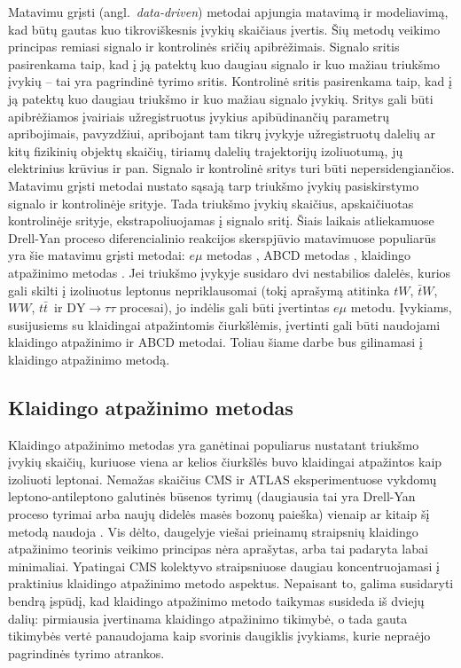 \documentclass[a4paper, 12pt, oneside]{article}
\newcommand{\tbarW}{\bar{t}W}
\newcommand{\ttbar}{t\bar{t}}
\newcommand{\emu}{e\mu}
\newcommand{\DYtau}{\mathrm{DY} \! \rightarrow \! \tau\tau}
\begin{document}
Matavimu grįsti (angl.\ \textit{data-driven}) metodai apjungia matavimą ir modeliavimą, kad būtų gautas kuo
tikroviškesnis įvykių skaičiaus įvertis.
Šių metodų veikimo principas remiasi signalo ir kontrolinės sričių apibrėžimais.
Signalo sritis pasirenkama taip, kad į ją patektų kuo daugiau signalo ir kuo mažiau triukšmo įvykių -- tai yra pagrindinė
tyrimo sritis.
Kontrolinė sritis pasirenkama taip, kad į ją patektų kuo daugiau triukšmo ir kuo mažiau signalo įvykių.
Sritys gali būti apibrėžiamos įvairiais užregistruotus įvykius apibūdinančių parametrų apribojimais, pavyzdžiui,
apribojant tam tikrų įvykyje užregistruotų dalelių ar kitų fizikinių objektų skaičių, tiriamų dalelių trajektorijų izoliuotumą, jų
elektrinius krūvius ir pan.
Signalo ir kontrolinė sritys turi būti nepersidengiančios.
Matavimu grįsti metodai nustato sąsają tarp triukšmo įvykių pasiskirstymo signalo ir kontrolinėje srityje.
Tada triukšmo įvykių skaičius, apskaičiuotas kontrolinėje srityje, ekstrapoliuojamas į signalo sritį.
Šiais laikais atliekamuose Drell-Yan proceso diferencialinio reakcijos skerspjūvio matavimuose populiarūs yra šie matavimu
grįsti metodai: $\emu$ metodas \cite{DY_CMS2011, DY_CMS2013, DY_ATLAS2014, DY_CMS2015, DY_CMS2019},
ABCD metodas \cite{DY_CMS2011, DY_CMS2013, DY_ATLAS2014, DY_CMS2015, DY_ATLAS2016, DY_ATLAS2017},
klaidingo atpažinimo metodas \cite{DY_CMS2011, DY_CMS2013, DY_ATLAS2013, DY_CMS2015, DY_ATLAS2016, DY_CMS2019}.
Jei triukšmo įvykyje susidaro dvi nestabilios dalelės, kurios gali skilti į izoliuotus leptonus nepriklausomai
(tokį aprašymą atitinka $tW$, $\tbarW$, $WW$, $\ttbar\,$ ir $\DYtau$ procesai), jo indėlis gali būti įvertintas $\emu$ metodu.
Įvykiams, susijusiems su klaidingai atpažintomis čiurkšlėmis, įvertinti gali būti naudojami klaidingo atpažinimo ir ABCD metodai.
Toliau šiame darbe bus gilinamasi į klaidingo atpažinimo metodą.


\subsection{Klaidingo atpažinimo metodas}\label{sec:FR}
Klaidingo atpažinimo metodas yra ganėtinai populiarus nustatant triukšmo įvykių skaičių, kuriuose viena ar kelios čiurkšlės
buvo klaidingai atpažintos kaip izoliuoti leptonai.
Nemažas skaičius CMS ir ATLAS eksperimentuose vykdomų leptono-antileptono galutinės būsenos tyrimų (daugiausia tai yra
Drell-Yan proceso tyrimai arba naujų didelės masės bozonų paieška) vienaip ar kitaip šį metodą naudoja
\cite{DY_CMS2011, DY_CMS2013, DY_ATLAS2013, DY_CMS2015, DY_ATLAS2016, DY_CMS2019, Z'_ATLAS2011, Z'_CMS2011, Z'_CMS2012,
Z'_CMS2013, Z'_ATLAS2014, Z'_CMS2015, Z'_CMS2017, Z'_CMS2018}.
Vis dėlto, daugelyje viešai prieinamų straipsnių klaidingo atpažinimo teorinis veikimo principas nėra aprašytas, arba tai padaryta
labai minimaliai.
Ypatingai CMS kolektyvo straipsniuose daugiau koncentruojamasi į praktinius klaidingo atpažinimo metodo aspektus.
Nepaisant to, galima susidaryti bendrą įspūdį, kad klaidingo atpažinimo metodo taikymas susideda iš dviejų dalių:
pirmiausia įvertinama klaidingo atpažinimo tikimybė, o tada gauta tikimybės vertė panaudojama kaip svorinis
daugiklis įvykiams, kurie nepraėjo pagrindinės tyrimo atrankos.
\end{document}
